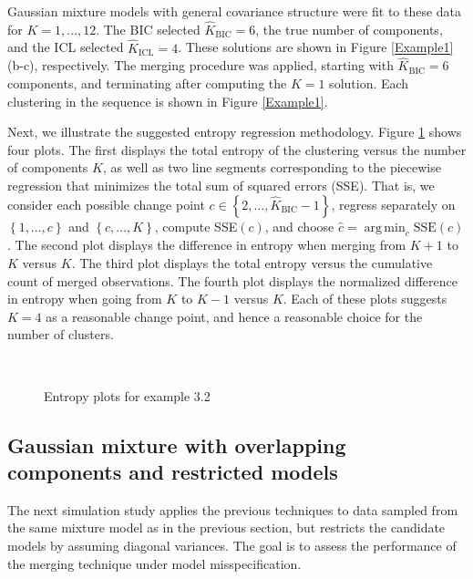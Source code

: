 \documentclass{uwstat572}
\newcommand*\set[1]{\left\{#1\right\}}
\newcommand*\estim[1]{\widehat{#1}}
\DeclareMathOperator*{\argmin}{arg\;min}
\renewcommand\;{\,}
\begin{document}
Gaussian mixture models with general covariance structure were fit to these data for $K = 1, \dotsc, 12$.
The BIC selected $\estim K_{\text{BIC}} = 6$, the true number of components, and the ICL selected $\estim K_{\text{ICL}} = 4$.
These solutions are shown in Figure \ref{Example1} (b-c), respectively.
The merging procedure was applied, starting with $\estim K_\text{BIC} = 6$ components, and terminating after computing the $K = 1$ solution.
Each clustering in the sequence is shown in Figure \ref{Example1}.

Next, we illustrate the suggested entropy regression methodology.
Figure \ref{Entropy1} shows four plots.
The first displays the total entropy of the clustering versus the number of components $K$, as well as two line segments corresponding to the piecewise regression that minimizes the total sum of squared errors (SSE).
That is, we consider each possible change point $c \in \set{2, \dotsc, \estim K_\text{BIC} - 1}$, regress separately on $\set{1, \dotsc, c}$ and $\set{c, \dotsc, K}$, compute SSE$(c)$, and choose $\estim c = \argmin_c \text{SSE}(c)$.
The second plot displays the difference in entropy when merging from $K + 1$ to $K$ versus $K$.
The third plot displays the total entropy versus the cumulative count of merged observations.
The fourth plot displays the normalized difference in entropy when going from $K$ to $K - 1$ versus $K$.
Each of these plots suggests $K = 4$ as a reasonable change point, and hence a reasonable choice for the number of clusters.

\begin{figure}
\begin{center}
\\
\end{center}
\caption{Entropy plots for example 3.2}
\label{Entropy1}
\end{figure}

\subsection{Gaussian mixture with overlapping components and restricted models}
The next simulation study applies the previous techniques to data sampled from the same mixture model as in the previous section, but restricts the candidate models by assuming diagonal variances.
The goal is to assess the performance of the merging technique under model misspecification.
\end{document}
